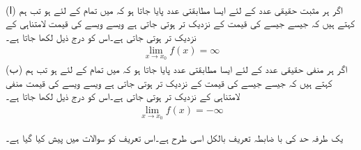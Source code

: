 \\
(ا)\quad
اگر ہر مثبت حقیقی عدد  کے لئے ایسا مطابقتی عدد  پایا جاتا ہو کہ   میں تمام  کے لئے  ہو تب ہم کہتے ہیں کہ جیسے جیسے  کی قیمت  کے نزدیک تر ہوتی جاتی ہے ویسے ویسے  کی قیمت لامتناہی کے نزدیک تر ہوتی جاتی ہے۔اس کو درج ذیل لکھا جاتا ہے۔
\begin{align*}
\lim_{x\to x_0} f(x)=\infty
\end{align*}   
(ب)\quad
اگر ہر منفی حقیقی عدد  کے لئے ایسا مطابقتی عدد  پایا جاتا ہو کہ   میں تمام  کے لئے  ہو تب ہم کہتے ہیں کہ جیسے جیسے  کی قیمت  کے نزدیک تر ہوتی جاتی ہے ویسے ویسے  کی قیمت منفی لامتناہی کے نزدیک تر ہوتی جاتی ہے۔اس کو درج ذیل لکھا جاتا ہے۔
\begin{align*}
\lim_{x\to x_0} f(x)=-\infty
\end{align*}  

یک طرفہ حد کی با ضابطہ تعریف بالکل اسی طرح ہے۔اس تعریف کو سوالات میں پیش کیا گیا ہے۔


